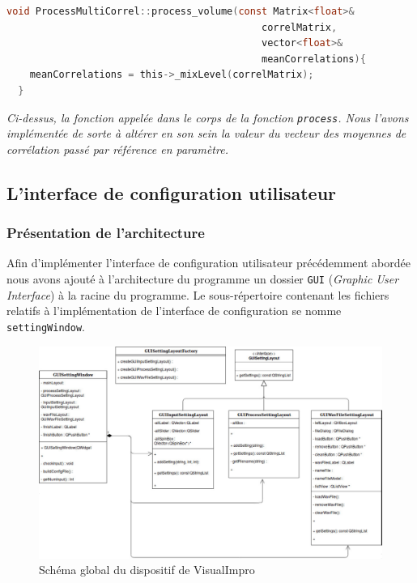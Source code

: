  \begin{lstlisting}[language=C, frame=single, breaklines=true]
  void ProcessMultiCorrel::process_volume(const Matrix<float>&
                                            correlMatrix,
                                            vector<float>&
                                            meanCorrelations){
    meanCorrelations = this->_mixLevel(correlMatrix);
  }
 \end{lstlisting}
 \begin{center}
  \textit{Ci-dessus, la fonction appelée dans le corps de la fonction \verb!process!. Nous l'avons implémentée de sorte à altérer en son sein la valeur du vecteur des moyennes de corrélation passé par référence en paramètre.}
 \end{center}

 \subsection{L'interface de configuration utilisateur}
 \paragraph{}

 \subsubsection{Présentation de l'architecture}
 Afin d'implémenter l'interface de configuration utilisateur
 précédemment abordée nous avons ajouté à l'architecture du programme
 un dossier \verb!GUI! (\textit{Graphic User Interface}) à la racine
 du programme.  Le sous-répertoire contenant les fichiers relatifs à
 l'implémentation de l'interface de configuration se nomme
 \verb!settingWindow!.

 \begin{figure}[h]
  \centering
  \includegraphics[scale=0.3]{assets/umlSettingWindow.png}
  \caption{Schéma global du dispositif de VisualImpro}
  \label{schéma global}
 \end{figure}


